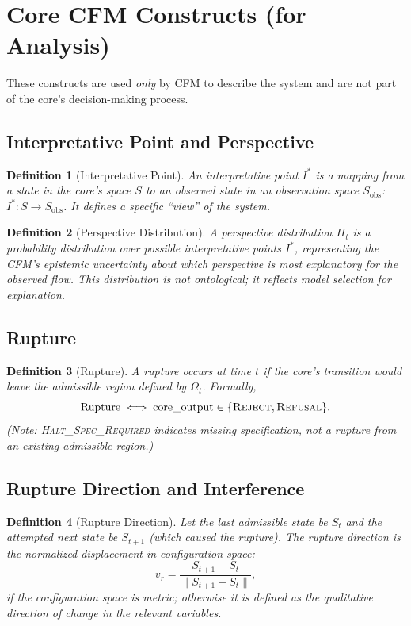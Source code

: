 \documentclass{article}
\newtheorem{definition}{Definition}[section]
\begin{document}
\section{Core CFM Constructs (for Analysis)}
These constructs are used \emph{only} by CFM to describe the system and are not part of the core's decision-making process.

\subsection{Interpretative Point and Perspective}
\begin{definition}[Interpretative Point]
An \emph{interpretative point} \(I^*\) is a mapping from a state in the core's space \(S\) to an observed state in an observation space \(S_{\text{obs}}\): \(I^*: S \to S_{\text{obs}}\). It defines a specific ``view'' of the system.
\end{definition}

\begin{definition}[Perspective Distribution]
A \emph{perspective distribution} \(\Pi_t\) is a probability distribution over possible interpretative points \(I^*\), representing the CFM's epistemic uncertainty about which perspective is most explanatory for the observed flow. This distribution is not ontological; it reflects model selection for explanation.
\end{definition}

\subsection{Rupture}
\begin{definition}[Rupture]
A \emph{rupture} occurs at time \(t\) if the core's transition would leave the admissible region defined by \(\Omega_t\). Formally,
\[
\text{Rupture} \iff \text{core\_output} \in \{\textsc{Reject}, \textsc{Refusal}\}.
\]
(Note: \textsc{Halt\_Spec\_Required} indicates missing specification, not a rupture from an existing admissible region.)
\end{definition}

\subsection{Rupture Direction and Interference}
\begin{definition}[Rupture Direction]
Let the last admissible state be \(S_t\) and the attempted next state be \(S_{t+1}\) (which caused the rupture). The \emph{rupture direction} is the normalized displacement in configuration space:
\[
v_r = \frac{S_{t+1} - S_t}{\|S_{t+1} - S_t\|},
\]
if the configuration space is metric; otherwise it is defined as the qualitative direction of change in the relevant variables.
\end{definition}
\end{document}
